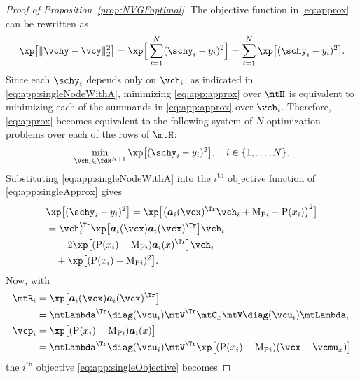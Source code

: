 \begin{proof}[Proof of Proposition~\ref{prop:NVGFoptimal}]
The objective function in \eqref{eq:approx} can be rewritten as
\begin{equation} \label{eq:app:approx}
    \xp \big[ \| \vchy - \vcy \|_2^{2} \big] = \xp \Big[ \sum_{i=1}^{N} (\schy_{i}-y_{i})^{2} \Big] = \sum_{i=1}^{N} \xp\big[ (\schy_{i}-y_{i})^{2} \big].
\end{equation}
%
Since each $\schy_{i}$ depends only on $\vch_{i}$, as indicated in \eqref{eq:app:singleNodeWithA}, minimizing \eqref{eq:app:approx} over $\mtH$ is equivalent to minimizing each of the summands in \eqref{eq:app:approx} over $\vch_{i}$. Therefore, \eqref{eq:approx} becomes equivalent to the following system of $N$ optimization problems over each of the rows of $\mtH$:
\begin{equation} \label{eq:app:singleApprox}
    \min_{\vch_{i} \in \fdR^{K+1}} \xp\big[ (\schy_{i}-y_{i})^{2} \big], \quad i \in \{1,\ldots,N\}.
\end{equation}
%
Substituting \eqref{eq:app:singleNodeWithA} into the $i^{\text{th}}$ objective function of \eqref{eq:app:singleApprox} gives
\begin{equation} \label{eq:app:singleObjective}
%
\begin{aligned}
    & \xp \big[ (\schy_{i}-y_{i})^{2} \big] = \xp \big[ \big(\vcfna_{i}(\vcx)^{\Tr} \vch_{i} + \mu_{\rho i} - \rho(x_{i}) \big)^{2} \big] \\
    & = \vch_{i}^{\Tr} \xp\big[\vcfna_{i}(\vcx) \vcfna_{i}(\vcx)^{\Tr}\big]\vch_{i} \\ & \quad - 2 \xp \big[ (\rho(x_{i})-\mu_{\rho i}) \vcfna_{i}(x)^{\Tr} \big]\vch_{i} \\ & \quad + \xp \big[ (\rho(x_{i})- \mu_{\rho i})^{2} \big].
\end{aligned}
%
\end{equation}
%
Now, with
%
\begin{align*}
    \mtR_{i} & = \xp \big[\vcfna_{i}(\vcx) \vcfna_{i}(\vcx)^{\Tr} \big] \\ & = \mtLambda^{\Tr} \diag(\vcu_{i}) \mtV^{\Tr} \mtC_{x} \mtV \diag(\vcu_{i}) \mtLambda, \label{eq:app:Ri} \\
    \vcp_{i} & = \xp \big[ (\rho(x_{i})-\mu_{\rho i}) \vcfna_{i}(x) \big] \\ & = \mtLambda^{\Tr} \diag(\vcu_{i}) \mtV^{\Tr} \xp \big[ (\rho(x_{i})- \mu_{\rho i}) (\vcx - \vcmu_{x}) \big] %
\end{align*}
%
the $i^\text{th}$ objective \eqref{eq:app:singleObjective} becomes

\end{proof}
